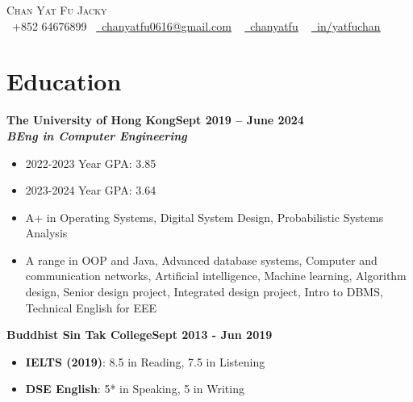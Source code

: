 \documentclass[a4paper,10pt]{article}
\begin{document}
\begin{center}
  {\Huge \scshape Chan Yat Fu Jacky} \\ \vspace{5pt}
  \small \raisebox{-0.1\height}\faPhone\ +852 64676899~ \href{mailto:chanyatfu0616@gmail.com}{\raisebox{-0.2\height}\faEnvelope\  \underline{chanyatfu0616@gmail.com}} ~
  \href{https://github.com/chanyatfu}{\raisebox{-0.2\height}\faGithub\ \underline{chanyatfu}} ~
  \href{https://hk.linkedin.com/in/yatfuchan}{\raisebox{-0.2\height}\faLinkedin\ \underline{in/yatfuchan}}  ~
  \vspace{-3pt}
\end{center}

\newcommand*{\bb}[2]{{\small\bfseries#1\hfill{\small#2}}\\}
\newcommand*{\cc}[2]{{\bfseries\textit{\small#1}\hfill\textit{\small#2}}\\}
\newenvironment{tightitemize}{\begin{itemize}[leftmargin=2em,topsep=1pt,partopsep=1pt,noitemsep]\small}{\end{itemize}\vspace*{2pt}}

\section{Education}

\bb{The University of Hong Kong}{Sept 2019 -- June 2024}
\cc{BEng in Computer Engineering}{}
\begin{tightitemize}
  \item 2022-2023 Year GPA: 3.85
  \item 2023-2024 Year GPA: 3.64
  \item A+ in Operating Systems, Digital System Design, Probabilistic Systems Analysis
  \item A range in OOP and Java, Advanced database systems, Computer and communication networks, Artificial intelligence, Machine learning, Algorithm design, Senior design project, Integrated design project, Intro to DBMS, Technical English for EEE
\end{tightitemize}

\bb{Buddhist Sin Tak College}{Sept 2013 - Jun 2019}
\begin{tightitemize}
  \item \textbf{IELTS (2019)}: 8.5 in Reading, 7.5 in Listening
  \item \textbf{DSE English}: 5* in Speaking, 5 in Writing
\end{tightitemize}
\end{document}
